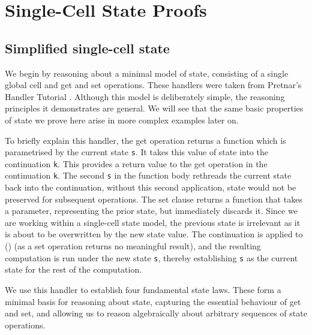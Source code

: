 \documentclass[logo,bsc,singlespacing,parskip]{infthesis}
\begin{document}
\section{Single-Cell State Proofs}

\subsection{Simplified single-cell state}

\label{subsec:simplified-state}
We begin by reasoning about a minimal model of state, consisting of a single global cell and get and set operations. These handlers were taken from Pretnar's Handler Tutorial \cite{pretnar_introduction_2015}. Although this model is deliberately simple, the reasoning principles it demonstrates are general. We will see that the same basic properties of state we prove here arise in more complex examples later on.  


To briefly explain this handler, the get operation returns a function which is parametrised by the current state \lstinline{s}. It takes this value of state into the continuation \lstinline{k}. This provides a return value to the get operation in the continuation \lstinline{k}. The second \lstinline{s} in the function body rethreads the current state back into the continuation, without this second application, state would not be preserved for subsequent operations. 
The set clause returns a function that takes a parameter, representing the prior state, but immediately discards it. Since we are working within a single-cell state model, the previous state is irrelevant as it is about to be overwritten by the new state value. The continuation is applied to () (as a set operation returns no meaningful result), and the resulting computation is run under the new state \lstinline{s}, thereby establishing \lstinline{s} as the current state for the rest of the computation.

We use this handler to establish four fundamental state laws. These form a minimal basis for reasoning about state, capturing the essential behaviour of get and set, and allowing us to reason algebraically about arbitrary sequences of state operations.
\end{document}
